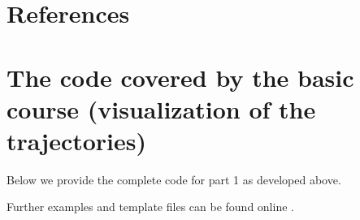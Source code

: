 \documentclass[12pt,ngerman,american]{iopart}
\begin{document}
\appendix
\section*{References}



\clearpage
\section{The code covered by the basic course (visualization of the trajectories)}\label{sec:code}
Below we provide the complete code for part 1 as developed above.

Further examples and template files can be found online \cite{scripts}.
\end{document}
